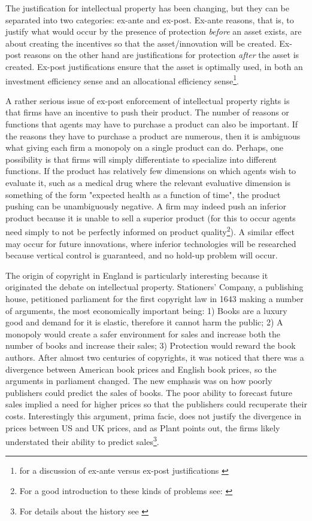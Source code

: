 
The justification for intellectual property has been changing, but they can be separated into two categories: ex-ante and ex-post. Ex-ante reasons, that is, to justify what would occur by the presence of protection \textit{before} an asset exists, are about creating the incentives so that the asset/innovation will be created. Ex-post reasons on the other hand are justifications for protection \textit{after} the asset is created. Ex-post justifications ensure that the asset is optimally used, in both an investment efficiency sense and an allocational efficiency sense\footnote{for a discussion of ex-ante versus ex-post justifications \cite{Lemleyt2004}}.

A rather serious issue of ex-post enforcement of intellectual property rights is that firms have an incentive to push their product. The number of reasons or functions that agents may have to purchase a product can also be important. If the reasons they have to purchase a product are numerous, then it is ambiguous what giving each firm a monopoly on a single product can do. Perhaps, one possibility is that firms will simply differentiate to specialize into different functions. If the product has relatively few dimensions on which agents wish to evaluate it, such as a medical drug where the relevant evaluative dimension is something of the form "expected health as a function of time", the product pushing can be unambiguously negative. A firm may indeed push an inferior product because it is unable to sell a superior product (for this to occur agents need simply to not be perfectly informed on product quality\footnote{For a good introduction to these kinds of problems see: \cite{spiegler2011bounded} }). A similar effect may occur for future innovations, where inferior technologies will be researched because vertical control is guaranteed, and no hold-up problem will occur.

The origin of copyright in England is particularly interesting because it originated the debate on intellectual property. Stationers' Company, a publishing house, petitioned parliament for the first copyright law in 1643 making a number of arguments, the most economically important being: 1) Books are a luxury good and demand for it is elastic, therefore it cannot harm the public; 2) A monopoly would create a safer environment for sales and increase both the number of books and increase their sales; 3) Protection would reward the book authors. After almost two centuries of copyrights, it was noticed that there was a divergence between American book prices and English book prices, so the arguments in parliament changed. The new emphasis was on how poorly publishers could predict the sales of books. The poor ability to forecast future sales implied a need for higher prices so that the publishers could recuperate their costs. Interestingly this argument, prima facie, does  not justify the divergence in prices between US and UK prices, and as Plant points out, the firms likely understated their ability to predict sales\footnote{For details about the history see \cite{Plant1934}}.

